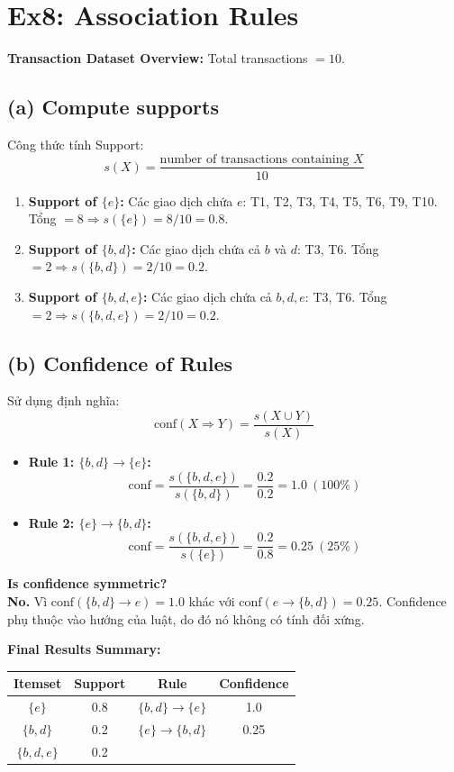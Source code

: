 \section{Ex8: Association Rules}

\textbf{Transaction Dataset Overview:} Total transactions $= 10$.

\subsection*{(a) Compute supports}
Công thức tính Support:
$$s(X) = \frac{\text{number of transactions containing } X}{10}$$
\begin{enumerate}
    \item \textbf{Support of $\{e\}$:} Các giao dịch chứa $e$: T1, T2, T3, T4, T5, T6, T9, T10. Tổng $= 8 \Rightarrow s(\{e\}) = 8/10 = 0.8$.
    \item \textbf{Support of $\{b, d\}$:} Các giao dịch chứa cả $b$ và $d$: T3, T6. Tổng $= 2 \Rightarrow s(\{b, d\}) = 2/10 = 0.2$.
    \item \textbf{Support of $\{b, d, e\}$:} Các giao dịch chứa cả $b, d, e$: T3, T6. Tổng $= 2 \Rightarrow s(\{b, d, e\}) = 2/10 = 0.2$.
\end{enumerate}

\subsection*{(b) Confidence of Rules}
Sử dụng định nghĩa:
$$\text{conf}(X \Rightarrow Y) = \frac{s(X \cup Y)}{s(X)}$$
\begin{itemize}
    \item \textbf{Rule 1: $\{b, d\} \rightarrow \{e\}$:}
    $$\text{conf} = \frac{s(\{b, d, e\})}{s(\{b, d\})} = \frac{0.2}{0.2} = 1.0 \ (100\%)$$
    \item \textbf{Rule 2: $\{e\} \rightarrow \{b, d\}$:}
    $$\text{conf} = \frac{s(\{b, d, e\})}{s(\{e\})} = \frac{0.2}{0.8} = 0.25 \ (25\%)$$
\end{itemize}

\textbf{Is confidence symmetric?} \\
\textbf{No.} Vì $\text{conf}(\{b, d\} \rightarrow e) = 1.0$ khác với $\text{conf}(e \rightarrow \{b, d\}) = 0.25$. Confidence phụ thuộc vào hướng của luật, do đó nó không có tính đối xứng.

\textbf{Final Results Summary:}
\begin{table}[H]
    \centering
    \begin{tabular}{|c|c|c|c|}
        \hline
        \textbf{Itemset} & \textbf{Support} & \textbf{Rule} & \textbf{Confidence} \\
        \hline
        $\{e\}$ & 0.8 & $\{b, d\} \rightarrow \{e\}$ & 1.0 \\ \hline
        $\{b, d\}$ & 0.2 & $\{e\} \rightarrow \{b, d\}$ & 0.25 \\ \hline
        $\{b, d, e\}$ & 0.2 & & \\ \hline
    \end{tabular}
\end{table}